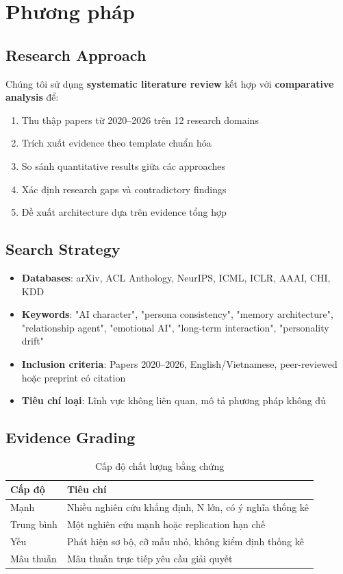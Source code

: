 \section{Phương pháp}

\subsection{Research Approach}

Chúng tôi sử dụng \textbf{systematic literature review} kết hợp với \textbf{comparative analysis} để:
\begin{enumerate}
    \item Thu thập papers từ 2020--2026 trên 12 research domains
    \item Trích xuất evidence theo template chuẩn hóa
    \item So sánh quantitative results giữa các approaches
    \item Xác định research gaps và contradictory findings
    \item Đề xuất architecture dựa trên evidence tổng hợp
\end{enumerate}

\subsection{Search Strategy}
\begin{itemize}
    \item \textbf{Databases}: arXiv, ACL Anthology, NeurIPS, ICML, ICLR, AAAI, CHI, KDD
    \item \textbf{Keywords}: "AI character", "persona consistency", "memory architecture", "relationship agent", "emotional AI", "long-term interaction", "personality drift"
    \item \textbf{Inclusion criteria}: Papers 2020--2026, English/Vietnamese, peer-reviewed hoặc preprint có citation
    \item \textbf{Tiêu chí loại}: Lĩnh vực không liên quan, mô tả phương pháp không đủ
\end{itemize}

\subsection{Evidence Grading}

\begin{table}[H]
\centering
\caption{Cấp độ chất lượng bằng chứng}
\label{tab:evidence-quality}
\begin{tabular}{ll}
\toprule
\textbf{Cấp độ} & \textbf{Tiêu chí} \\
\midrule
Mạnh & Nhiều nghiên cứu khẳng định, N lớn, có ý nghĩa thống kê \\
Trung bình & Một nghiên cứu mạnh hoặc replication hạn chế \\
Yếu & Phát hiện sơ bộ, cỡ mẫu nhỏ, không kiểm định thống kê \\
Mâu thuẫn & Mâu thuẫn trực tiếp yêu cầu giải quyết \\
\bottomrule
\end{tabular}
\end{table}

